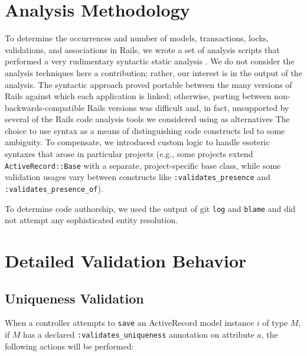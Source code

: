 \small

\section{Analysis Methodology}

\label{sec:appendix-methodology}

To determine the occurrences and number of models, transactions, locks, validations, and associations in Rails, we wrote a set of analysis scripts that performed a very rudimentary syntactic static analysis . We do not consider the analysis techniques here a contribution; rather, our interest is in the output of the analysis. The syntactic approach proved portable between the many versions of Rails against which each application is linked; otherwise, porting between non-backwards-compatible Rails versions was difficult and, in fact, unsupported by several of the Rails code analysis tools we considered using as alternatives The choice to use syntax as a means of distinguishing code constructs led to some ambiguity. To compensate, we introduced custom logic to handle esoteric syntaxes that arose in particular projects (e.g., some projects extend \texttt{ActiveRecord::Base} with a separate, project-specific base class, while some validation usages vary between constructs like \texttt{:validates\_presence} and \texttt{:validates\_presence\_of}).

To determine code authorship, we used the output of git \texttt{log} and \texttt{blame} and did not attempt any sophisticated entity resolution.

\section{Detailed Validation Behavior}



\subsection{Uniqueness Validation}
\label{sec:appendix-uniqueness-behavior}

When a controller attempts to \texttt{save} an ActiveRecord model instance $i$ of type $M$, if $M$ has a declared \texttt{:validates\_uniqueness} annotation on attribute $a$, the following actions will be performed:

